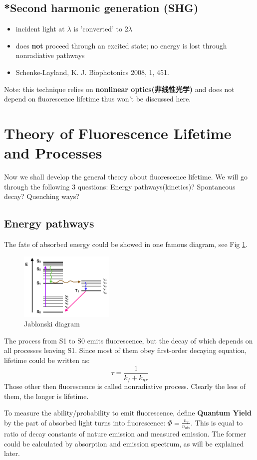 \documentclass[12pt]{ctexart}
\begin{document}
\subsection*{*Second harmonic generation (SHG)}
\begin{itemize}
    \item incident light at $\lambda$ is 'converted' to 2$\lambda$
    \item does \textbf{not} proceed through an excited state; no energy is lost through nonradiative pathways
    \item Schenke-Layland, K. J. Biophotonics 2008, 1, 451.
\end{itemize}
\begin{framed}
    Note: this technique relies on \textbf{nonlinear optics(非线性光学)} and does not depend on fluorescence lifetime thus won't be discussed here.
\end{framed}

\section{Theory of Fluorescence Lifetime and Processes}
\par Now we shall develop the general theory about fluorescence lifetime. We will go through the following 3 questions: Energy pathways(kinetics)? Spontaneous decay? Quenching ways?
\subsection*{Energy pathways}
The fate of absorbed energy could be showed in one famous diagram, see Fig \ref{Jablonski_diagram}.
\begin{figure}[t]
    \centering
    \includegraphics[width=0.4\textwidth]{Jablonski diagram.png}
    \caption{Jablonski diagram}
    \label{Jablonski_diagram}
\end{figure}
The process from S1 to S0 emits fluorescence, but the decay of which depends on all processes leaving S1. Since most of them obey first-order decaying equation, lifetime could be written as:
\begin{equation}
    \tau=\frac{1}{k_f+k_{nr}}
\end{equation}
\noindent Those other then fluorescence is called nonradiative process. Clearly the less of them, the longer is lifetime. 
\par To measure the ability/probability to emit fluorescence, define \textbf{Quantum Yield} by the part of absorbed light turns into fluorescence: $\Phi=\frac{n_{f}}{n_{abs}}$. This is equal to ratio of decay constants of nature emission and measured emission. The former could be calculated by absorption and emission spectrum, as will be explained later.
\end{document}

